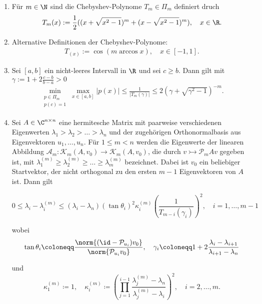 \documentclass{article}
\begin{document}
\begin{enumerate}
	\item Für $m \in \N$ sind die Chebyshev-Polynome $T_m \in \Pi_m$ definiert druch
	\begin{align}\label{chebyshev}
		T_m(x) := \frac{1}{2}((x+ \sqrt{x^2 - 1})^m + (x- \sqrt{x^2 - 1})^m), \quad x \in \R.
	\end{align}

	\item Alternative Definitionen der Chebyshev-Polynome:
	\begin{align}\label{chebyalt}
		T_(x) := \cos(m \arccos x), \quad x \in [-1,1].
	\end{align}
	
	\item Sei $[a,b]$ ein nicht-leeres Intervall in $\R$ und sei $c \geq b$. Dann gilt mit $\gamma := 1 + 2 \frac{c-b}{b-a} > 0$
		\begin{align}\label{polminmax}
			\min_{\substack{p \in \Pi_m \\
					p(c) = 1}} \max_{x \in [a,b]} |p(x)| \leq \frac{1}{|T_m(\gamma)|} \leq 2 (\gamma + \sqrt{\gamma^2 -1})^{-m}.
		\end{align}
	
	\item Sei $A \in \C^{n \times n}$ eine hermitesche Matrix mit paarweise verschiedenen Eigenwerten $\lambda_1 > \lambda_2 > \dots > \lambda_n$ und der zugehörigen Orthonormalbasis aus Eigenvektoren $u_1,\dots,u_n$. Für $1 \le m < n$ werden die Eigenwerte der linearen Abbildung $\mathcal{A}_m: \mathcal{K}_m(A,v_0)\rightarrow \mathcal{K}_m(A,v_0)$, die durch $v \rightarrowtail \mathcal{P}_mAv$ gegeben ist,  mit $\lambda_1^{(m)} \ge \lambda_2^{(m)} \ge \dots \ge \lambda_m^{(m)}$ bezeichnet. Dabei ist $v_0$ ein beliebiger Startvektor, der nicht orthogonal zu den ersten $m-1$ Eigenvektoren von $A$ ist. Dann gilt
	
	\begin{equation}
		\label{konvergenz Eigenwerte}
		0 \le \lambda_i - \lambda_i^{(m)} \le (\lambda_i -\lambda_n) (\tan\theta_i)^2 \kappa_i^{(m)} \left(\frac{1}{T_{m-i}(\gamma_i)}\right)^2, \quad i=1,\dots,m-1
	\end{equation}
	
	wobei
	\begin{equation*}
		\tan \theta_i \coloneqq \frac{\norm{(\id - \mathcal{P}_{u_i})v_0}}{\norm{ \mathcal{P}_{u_i}v_0}}, \quad \gamma_i \coloneqq 1+2 \frac{\lambda_i-\lambda_{i+1}}{\lambda_{i+1} -\lambda_n}
	\end{equation*}
	
	und
	\begin{equation*}
		\kappa_1^{(m)} \coloneqq 1, \quad \kappa_i^{(m)} \coloneqq \left(\prod_{j=1}^{i-1} \frac{\lambda_j^{(m)} - \lambda_n}{\lambda_j^{(m)} - \lambda_i}\right)^2, \quad i = 2,\dots,m.
	\end{equation*}
\end{enumerate}
\end{document}
